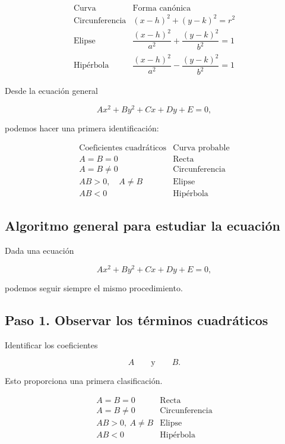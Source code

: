 \documentclass[12pt]{article}
\begin{document}
\[
\boxed{
\begin{array}{c|c}
\text{Curva} & \text{Forma canónica}\\
\hline
\text{Circunferencia}
&
(x-h)^2+(y-k)^2=r^2
\\[2mm]
\text{Elipse}
&
\dfrac{(x-h)^2}{a^2}
+
\dfrac{(y-k)^2}{b^2}
=1
\\[4mm]
\text{Hipérbola}
&
\dfrac{(x-h)^2}{a^2}
-
\dfrac{(y-k)^2}{b^2}
=1
\end{array}
}
\]

Desde la ecuación general

\[
Ax^2+By^2+Cx+Dy+E=0,
\]

podemos hacer una primera identificación:

\[
\boxed{
\begin{array}{c|c}
\text{Coeficientes cuadráticos} & \text{Curva probable}\\
\hline
A=B=0 & \text{Recta}\\
A=B\neq0 & \text{Circunferencia}\\
AB>0,\quad A\neq B & \text{Elipse}\\
AB<0 & \text{Hipérbola}
\end{array}
}
\]

\subsection*{Algoritmo general para estudiar la ecuación}

Dada una ecuación

\[
Ax^2+By^2+Cx+Dy+E=0,
\]

podemos seguir siempre el mismo procedimiento.

\subsection*{Paso 1. Observar los términos cuadráticos}

Identificar los coeficientes

\[
A
\qquad\text{y}\qquad
B.
\]

Esto proporciona una primera clasificación.

\[
\begin{array}{c|c}
A=B=0 & \text{Recta}\\
A=B\neq0 & \text{Circunferencia}\\
AB>0,\ A\neq B & \text{Elipse}\\
AB<0 & \text{Hipérbola}
\end{array}
\]
\end{document}

